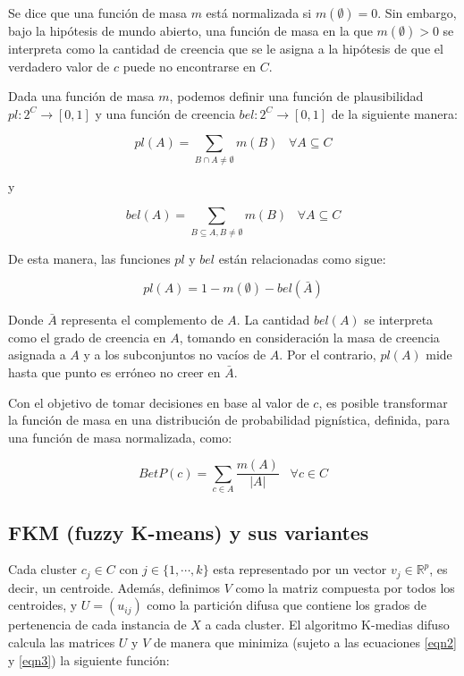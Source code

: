 Se dice que una función de masa $m$ está normalizada si $m(\emptyset) = 0$. Sin embargo, bajo la hipótesis de mundo abierto, una función de masa en la que $m(\emptyset) > 0$ se interpreta como la cantidad de creencia que se le asigna a la hipótesis de que el verdadero valor de $c$ puede no encontrarse en $C$.

Dada una función de masa $m$, podemos definir una función de plausibilidad $pl:2^C \rightarrow [0,1]$ y una función de creencia $bel: 2^C \rightarrow [0,1]$ de la siguiente manera:

\begin{equation}
pl(A) = \sum_{B \cap A \neq \emptyset} m(B) \;\;\; \forall A \subseteq C
\label{eqn4}
\end{equation}

y 

\begin{equation}
bel(A) = \sum_{B \subseteq A, B \neq \emptyset} m(B) \;\;\; \forall A \subseteq C
\label{eqn5}
\end{equation}

De esta manera, las funciones $pl$ y $bel$ están relacionadas como sigue:

\begin{equation}
pl(A) = 1 - m(\emptyset) - bel(\bar{A})
\label{eqn6}
\end{equation}

Donde $\bar{A}$ representa el complemento de $A$.  La cantidad $bel(A)$ se interpreta como el grado de creencia en $A$, tomando en consideración la masa de creencia asignada a $A$ y a los subconjuntos no vacíos de $A$. Por el contrario, $pl(A)$ mide hasta que punto es erróneo no creer en $\bar{A}$.

Con el objetivo de tomar decisiones en base al valor de $c$, es posible transformar la función de masa en una distribución de probabilidad pignística, definida, para una función de masa normalizada, como:

\begin{equation}
BetP(c) = \sum_{c \in A} \frac{m(A)}{|A|} \;\;\; \forall c \in C
\label{eqn7}
\end{equation}

\subsection{FKM (fuzzy K-means) y sus variantes}

Cada cluster $c_j \in C$ con $j \in \{1,\cdots,k\}$ esta representado por un vector $v_j \in \mathbb{R}^p$, es decir, un centroide. Además, definimos $V$ como la matriz compuesta por todos los centroides, y $U = (u_{ij})$ como la partición difusa que contiene los grados de pertenencia de cada instancia de $X$ a cada cluster. El algoritmo K-medias difuso calcula las matrices $U$ y $V$ de manera que minimiza (sujeto a las ecuaciones \ref{eqn2} y \ref{eqn3}) la siguiente función:

